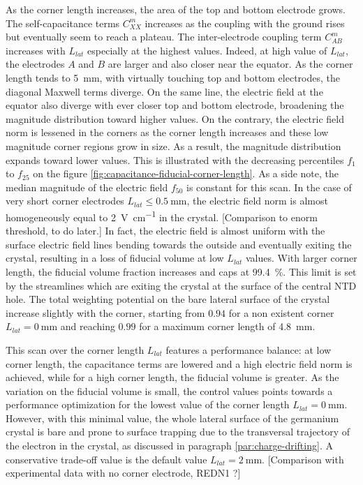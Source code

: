 As the corner length increases, the area of the top and bottom electrode grows. The self-capacitance terms $C_{XX}^m$ increases as the coupling with the ground rises but eventually seem to reach a plateau. The inter-electrode coupling term $C_{AB}^m$ increases with $L_{lat}$ especially at the highest values. Indeed, at high value of $L_{lat}$, the electrodes $A$ and $B$ are larger and also closer near the equator. As the corner length tends to \SI{5}{\mm}, with virtually touching top and bottom electrodes, the diagonal Maxwell terms diverge. On the same line, the electric field at the equator also diverge with ever closer top and bottom electrode, broadening the magnitude distribution toward higher values.
On the contrary, the electric field norm is lessened in the corners as the corner length increases and these low magnitude corner regions grow in size. As a result, the magnitude distribution expands toward lower values. This is illustrated with the decreasing percentiles $f_1$ to $f_{25}$ on the figure \ref{fig:capacitance-fiducial-corner-length}. As a side note, the median magnitude of the electric field $f_{50}$ is constant for this scan. In the case of very short corner electrodes $L_{lat} \leq \SI{0.5}{\mm}$, the electric field norm is almost homogeneously equal to \SI{2}{\volt\per\cm} in the crystal.
{\color{red} [Comparison to enorm threshold, to do later.]}
In fact, the electric field is almost uniform with the surface electric field lines bending towards the outside and eventually exiting the crystal, resulting in a loss of fiducial volume at low $L_{lat}$ values. With larger corner length, the fiducial volume fraction increases and caps at \SI{99.4}{\percent}. This limit is set by the streamlines which are exiting the crystal at the surface of the central NTD hole.
The total weighting potential on the bare lateral surface of the crystal increase slightly with the corner, starting from $0.94$ for a non existent corner $L_{lat}=\SI{0}{\mm}$ and reaching $0.99$ for a maximum corner length of \SI{4.8}{\mm}.   

This scan over the corner length $L_{lat}$ features a performance balance: at low corner length, the capacitance terms are lowered and a high electric field norm is achieved, while for a high corner length, the fiducial volume is greater. As the variation on the fiducial volume is small, the control values points towards a performance optimization for the lowest value of the corner length $L_{lat}=\SI{0}{\mm}$. However, with this minimal value, the whole lateral surface of the germanium crystal is bare and prone to surface trapping due to the transversal trajectory of the electron in the crystal, as discussed in paragraph \ref{par:charge-drifting}. A conservative trade-off value is the default value $L_{lat}=\SI{2}{\mm}$.
{\color{red} [Comparison with experimental data with no corner electrode, REDN1 ?]}

